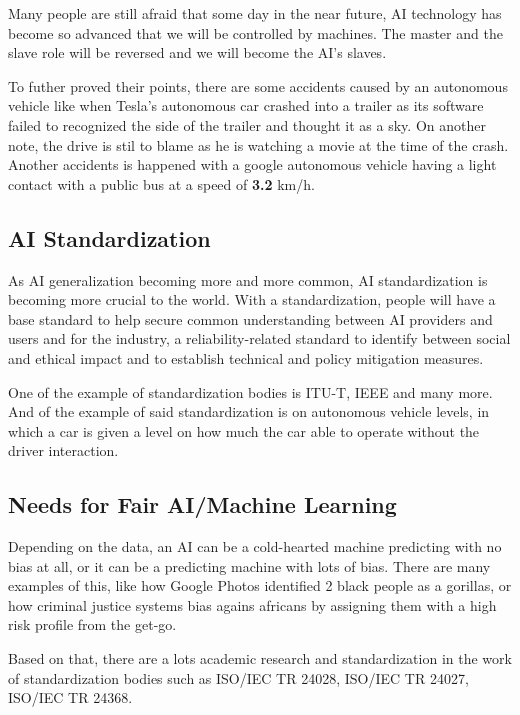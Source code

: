 \documentclass[12pt, a4paper]{article}
\begin{document}
Many people are still afraid that some day in the near future, AI technology has become so advanced that we will be controlled by machines. The master and the slave role will be reversed and we will become the AI's slaves.

To futher proved their points, there are some accidents caused by an autonomous vehicle like when Tesla's autonomous car crashed into a trailer as its software failed to recognized the side of the trailer and thought it as a sky. On another note, the drive is stil to blame as he is watching a movie at the time of the crash. Another accidents is happened with a google autonomous vehicle having a light contact with a public bus at a speed of \textbf{3.2} km/h.

\subsection*{AI Standardization}

As AI generalization becoming more and more common, AI standardization is becoming more crucial to the world. With a standardization, people will have a base standard to help secure common understanding between AI providers and users and for the industry, a reliability-related standard to identify between social and ethical impact and to establish technical and policy mitigation measures.

One of the example of standardization bodies is ITU-T, IEEE and many more. And of the example of said standardization is on autonomous vehicle levels, in which a car is given a level on how much the car able to operate without the driver interaction.

\subsection*{Needs for Fair AI/Machine Learning}

Depending on the data, an AI can be a cold-hearted machine predicting with no bias at all, or it can be a predicting machine with lots of bias. There are many examples of this, like how Google Photos identified 2 black people as a gorillas, or how criminal justice systems bias agains africans by assigning them with a high risk profile from the get-go.

Based on that, there are a lots academic research and standardization in the work of standardization bodies such as ISO/IEC TR 24028, ISO/IEC TR 24027, ISO/IEC TR 24368.
\end{document}

